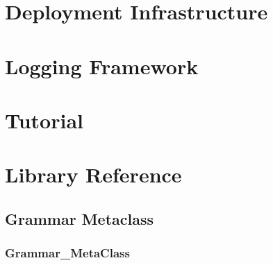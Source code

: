 \documentclass[letterpaper,10pt,english]{sphinxmanual}
\begin{document}
\section{Deployment Infrastructure}
\label{Deployment_Infrastructure:deployment-infrastructure}\label{Deployment_Infrastructure::doc}

\section{Logging Framework}
\label{Logging_Framework::doc}\label{Logging_Framework:logging-framework}

\section{Tutorial}
\label{Tutorial::doc}\label{Tutorial:tutorial}

\section{Library Reference}
\label{Library_Reference:library-reference}\label{Library_Reference::doc}\label{Library_Reference:id1}

\subsection{Grammar Metaclass}
\label{Library_Reference:grammar-metaclass}

\subsubsection{Grammar\_MetaClass}
\label{class_Grammar_MetaClass:grammar-metaclass}\label{class_Grammar_MetaClass::doc}\label{class_Grammar_MetaClass:id1}
\end{document}
